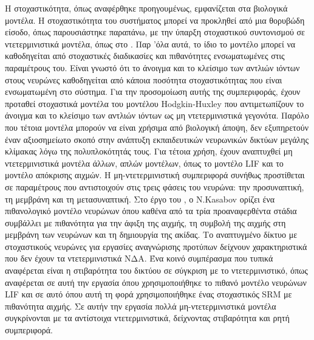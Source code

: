 \documentclass[12pt]{report}
\begin{document}
Η στοχαστικότητα, όπως αναφέρθηκε προηγουμένως, εμφανίζεται στα βιολογικά μοντέλα. Η στοχαστικότητα του συστήματος μπορεί να προκληθεί από μια θορυβώδη είσοδο, όπως παρουσιάστηκε παραπάνω, με την ύπαρξη στοχαστικού συντονισμού σε ντετερμινιστικά μοντέλα, όπως στο \cite{Clayton2011}. Παρ 'όλα αυτά, το ίδιο το μοντέλο μπορεί να καθοδηγείται από στοχαστικές διαδικασίες και πιθανότητες ενσωματωμένες στις παραμέτρους του. Είναι γνωστό ότι το άνοιγμα και το κλείσιμο των αντλιών ιόντων στους νευρώνες καθοδηγείται από κάποια ποσότητα στοχαστικότητας που είναι ενσωματωμένη στο σύστημα. Για την προσομοίωση αυτής της συμπεριφοράς, έχουν προταθεί στοχαστικά μοντέλα του μοντέλου \textlatin{Hodgkin-Huxley} \cite{Fox1997} που αντιμετωπίζουν το άνοιγμα και το κλείσιμο των αντλιών ιόντων ως μη ντετερμινιστικά γεγονότα. Παρόλο που τέτοια μοντέλα μπορούν να είναι χρήσιμα από βιολογική άποψη, δεν εξυπηρετούν έναν αξιοσημείωτο σκοπό στην ανάπτυξη εκπαιδευτικών νευρωνικών δικτύων μεγάλης κλίμακας λόγω της πολυπλοκότητάς τους. Για τέτοια χρήση, έχουν αναπτυχθεί μη ντετερμινιστικά μοντέλα άλλων, απλών μοντέλων, όπως το μοντέλο \textlatin{LIF} και το μοντέλο απόκρισης αιχμών. Η μη-ντετερμινιστική συμπεριφορά συνήθως προστίθεται σε παραμέτρους που αντιστοιχούν στις τρεις φάσεις του νευρώνα: την προσυναπτική, τη μεμβράνη και τη μετασυναπτική. Στο έργο του \cite{Kasabov2010}, ο \textlatin{N.Kasabov} ορίζει ένα πιθανολογικό μοντέλο νευρώνων όπου καθένα από τα τρία προαναφερθέντα στάδια συμβάλλει με πιθανότητα για την άφιξη της αιχμής, τη συμβολή της αιχμής στη μεμβράνη των νευρώνων και τη δημιουργία της ακίδας. Το αναπτυγμένο δίκτυο με στοχαστικούς νευρώνες για εργασίες αναγνώρισης προτύπων δείχνουν χαρακτηριστικά που δεν έχουν τα ντετερμινιστικά ΝΔΑ. Ένα κοινό συμπέρασμα που τυπικά αναφέρεται είναι η στιβαρότητα του δικτύου σε σύγκριση με το ντετερμινιστικό, όπως αναφέρεται σε αυτή την εργασία \cite{Dhoble2011} όπου χρησιμοποιήθηκε το πιθανό μοντέλο νευρώνων \textlatin{LIF} και σε αυτό \cite{Sinyavskiy2010} όπου αυτή τη φορά χρησιμοποιήθηκε ένας στοχαστικός \textlatin{SRM} με πιθανότητα αιχμής. Σε αυτήν την εργασία \cite{Wu2012} πολλά μη-ντετερμινιστικά μοντέλα συγκρίνονται με τα αντίστοιχα ντετερμινιστικά, δείχνοντας στιβαρότητα και ρητή συμπεριφορά.
\end{document}

